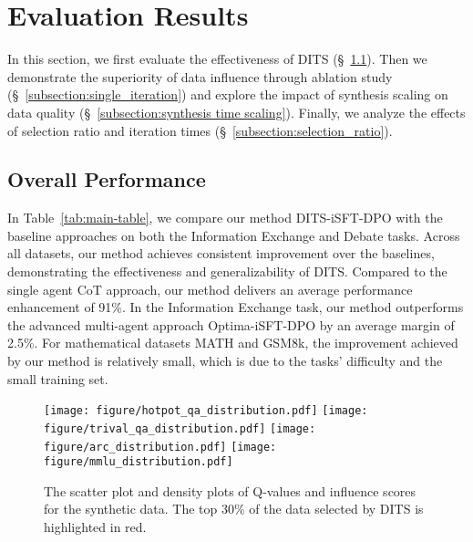 
\section{Evaluation Results}
\label{section:experiments}

In this section, we first evaluate the effectiveness of DITS (§~\ref{subsection:main_results}). Then we demonstrate the superiority of data influence through ablation study (§~\ref{subsection:single_iteration}) and explore the impact of synthesis scaling on data quality (§~\ref{subsection:synthesis time scaling}). Finally, we analyze the effects of selection ratio and iteration times (§~\ref{subsection:selection_ratio}).



\subsection{Overall Performance}
\label{subsection:main_results}
In Table~\ref{tab:main-table}, we compare our method DITS-iSFT-DPO with the baseline approaches on both the Information Exchange and Debate tasks. Across all datasets, our method achieves consistent improvement over the baselines, demonstrating the effectiveness and generalizability of DITS. Compared to the single agent CoT approach, our method delivers an average performance enhancement of 91\%. In the Information Exchange task, our method outperforms the advanced multi-agent approach Optima-iSFT-DPO by an average margin of 2.5\%. For mathematical datasets MATH and GSM8k, the improvement achieved by our method is relatively small, which is due to the tasks' difficulty and the small training set.



%
\begin{figure*}
    \centering
    \texttt{[image: figure/hotpot\_qa\_distribution.pdf]}
    \texttt{[image: figure/trival\_qa\_distribution.pdf]}
    \texttt{[image: figure/arc\_distribution.pdf]}
    \texttt{[image: figure/mmlu\_distribution.pdf]}
    \caption{The scatter plot and density plots of Q-values and influence scores for the synthetic data. The top 30\% of the data selected by DITS is highlighted in red.}
    \label{fig:distribution_analysis}
\end{figure*}

